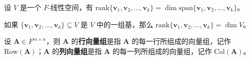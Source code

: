 \begin{proposition}
    设 $V$ 是一个 $F$-线性空间，有 $\mathrm{rank}\{\mathbf{v}_1,\mathbf{v}_2,\ldots,\mathbf{v}_k\}= \dim \mathrm{span}\{\mathbf{v}_1,\mathbf{v}_2,\ldots,\mathbf{v}_k\}$。
\end{proposition}

\begin{corollary}
    如果 $\{\mathbf{v}_1,\mathbf{v}_2,\ldots,\mathbf{v}_k\}\subseteq V$ 是 $V$ 中的一组基，那么 $\mathrm{rank}\{\mathbf{v}_1,\mathbf{v}_2,\ldots,\mathbf{v}_k\} = \dim V$。
\end{corollary}

\begin{definition}[行向量组与列向量组]
    设 $\mathbf{A} \in F^{m \times n}$，则 $\mathbf{A}$ 的\textbf{行向量组}是指 $\mathbf{A}$ 的每一行所组成的向量组，记作 $\mathrm{Row}(\mathbf{A})$；$\mathbf{A}$ 的\textbf{列向量组}是指 $\mathbf{A}$ 的每一列所组成的向量组，记作 $\mathrm{Col}(\mathbf{A})$。
\end{definition}
\vspace{1em}

